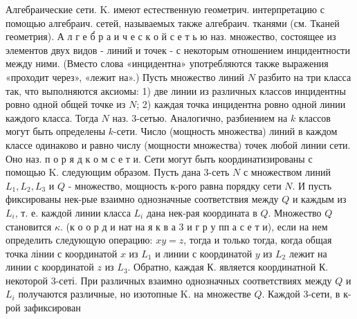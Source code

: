 \documentclass[10pt]{article}
\begin{document}
Алгебраические сети. K. имеют естественную геометрич. интерпретацию с помощью алгебраич. сетей, называемых также алгебраич. тканями (см. Тканей геометрия). А л г е б́ р а и ч е с к о й с е т ь ю наз. множество, состоящее из элементов двух видов - линий и точек - с некоторым отношением инцидентности между ними. (Вместо слова «инцидентна» употребляются также выражения «проходит через», «лежит на».) Пусть множество линий $N$ разбито на три класса так, что выполняются аксиомы: 1) две линии из различных классов инцидентны ровно одной общей точке из $N$; 2) каждая точка инцидентна ровно одной линии каждого класса. Тогда $N$ наз. 3-сетью. Аналогично, разбиением на $k$ классов могут быть определены $k$-сети. Число (мощность множества) линий в каждом классе одинаково и равно числу (мощности множества) точек любой линии сети. Оно наз. п о р я д к о м с е т и. Сети могут быть координатизированы с помощью $\mathrm{K}$. следующим образом. Пусть дана 3-сеть $N$ с множеством линий $L_{1}, L_{2}, L_{3}$ и $Q$ - множество, мощность к-рого равна порядку сети $N$. И пусть фиксированы нек-рые взаимно однозначные соответствия между $Q$ и каждым из $L_{i}$, т. е. каждой линии класса $L_{i}$ дана нек-рая координата в $Q$. Множество $Q$ становится $\kappa$. (к о о р д и нат на я к в а 3 и г р у пп а с е т и), если на нем определить следующую операцию: $x y=z$, тогда и только тогда, когда общая точка лінии с координатой $x$ из $L_{1}$ и линии с координатой $y$ из $L_{2}$ лежит на линии с координатой $z$ из $L_{3}$. Обратно, каждая $К$. является координатной $К$. некоторой 3-сеті. При различных взаимно однозначных соответствиях между $Q$ и $L_{i}$ получаются различные, но изотопные $\mathrm{K}$. на множестве $Q$. Каждой 3-сети, в к-рой зафиксирован
\end{document}
